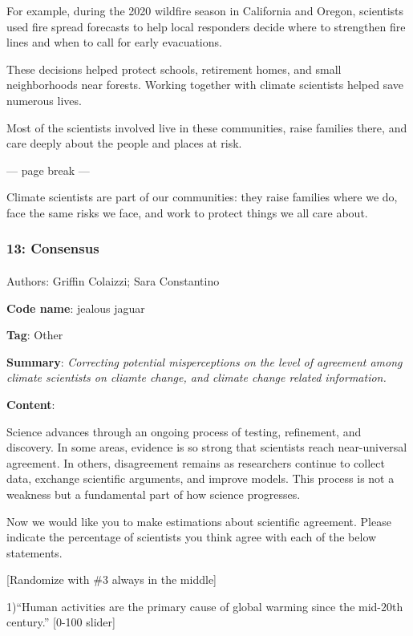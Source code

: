 \documentclass[
  letterpaper,
  DIV=11,
  numbers=noendperiod]{scrartcl}
\makeatletter
\let\oldparagraph\paragraph
\renewcommand{\paragraph}{
    \@ifstar
      \xxxParagraphStar
      \xxxParagraphNoStar
  }
\newcommand{\xxxParagraphStar}[1]{\oldparagraph*{#1}\mbox{}}
\newcommand{\xxxParagraphNoStar}[1]{\oldparagraph{#1}\mbox{}}
\makeatother
\begin{document}
For example, during the 2020 wildfire season in California and Oregon,
scientists used fire spread forecasts to help local responders decide
where to strengthen fire lines and when to call for early evacuations.

These decisions helped protect schools, retirement homes, and small
neighborhoods near forests. Working together with climate scientists
helped save numerous lives.

Most of the scientists involved live in these communities, raise
families there, and care deeply about the people and places at risk.

--- page break ---

Climate scientists are part of our communities: they raise families
where we do, face the same risks we face, and work to protect things we
all care about.

\subsubsection{13: Consensus}\label{consensus}

\paragraph{Authors: Griffin Colaizzi; Sara
Constantino}\label{authors-griffin-colaizzi-sara-constantino}

\textbf{Code name}: jealous jaguar

\textbf{Tag}: Other

\textbf{Summary}: \emph{Correcting potential misperceptions on the level
of agreement among climate scientists on cliamte change, and climate
change related information.}

\textbf{Content}:

Science advances through an ongoing process of testing, refinement, and
discovery. In some areas, evidence is so strong that scientists reach
near-universal agreement. In others, disagreement remains as researchers
continue to collect data, exchange scientific arguments, and improve
models. This process is not a weakness but a fundamental part of how
science progresses.

Now we would like you to make estimations about scientific agreement.
Please indicate the percentage of scientists you think agree with each
of the below statements.

{[}Randomize with \#3 always in the middle{]}

1)``Human activities are the primary cause of global warming since the
mid-20th century.'' {[}0-100 slider{]}
\end{document}
